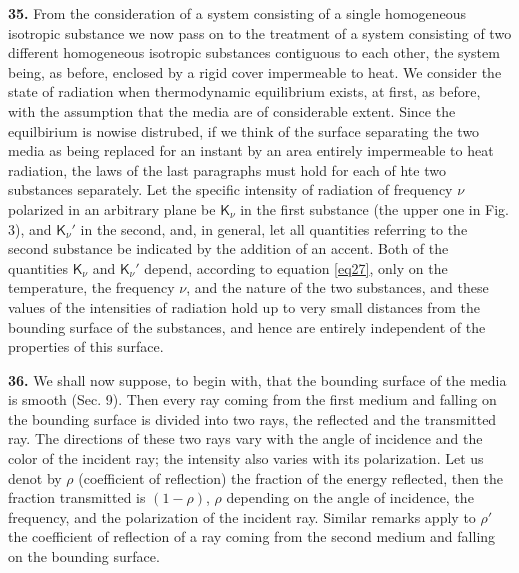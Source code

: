 \documentclass[12pt,oneside]{book}
\begin{document}
\textbf{35.} From the consideration of a system consisting of a single homogeneous isotropic substance we now pass on to the treatment of a system consisting of two different homogeneous isotropic substances contiguous to each other, the system being, as before, enclosed by a rigid cover impermeable to heat. We consider the state of radiation when thermodynamic equilibrium exists, at first, as before, with the assumption that the media are of considerable extent. Since the equilbirium is nowise distrubed, if we think of the surface separating the two media as being replaced for an instant by an area entirely impermeable to heat radiation, the laws of the last paragraphs must hold for each of hte two substances separately. Let the specific intensity of radiation of frequency $\nu$ polarized in an arbitrary plane be $\mathsf{K}_\nu$ in the first substance (the upper one in Fig. 3), and $\mathsf{K}_\nu'$ in the second, and, in general, let all quantities referring to the second substance be indicated by the addition of an accent. Both of the quantities $\mathsf{K}_\nu$ and $\mathsf{K}_\nu'$ depend, according to equation \eqref{eq27}, only on the temperature, the frequency $\nu$, and the nature of the two substances, and these values of the intensities of radiation hold up to very small distances from the bounding surface of the substances, and hence are entirely independent of the properties of this surface. \par 

\textbf{36.} We shall now suppose, to begin with, that the bounding surface of the media is smooth (Sec. 9). Then every ray coming from the first medium and falling on the bounding surface is divided into two rays, the reflected and the transmitted ray. The directions of these two rays vary with the angle of incidence and the color of the incident ray; the intensity also varies with its polarization. Let us denot by $\rho$ (coefficient of reflection) the fraction of the energy reflected, then the fraction transmitted is $(1-\rho)$, $\rho$ depending on the angle of incidence, the frequency, and the polarization of the incident ray. Similar remarks apply to $\rho'$ the coefficient of reflection of a ray coming from the second medium and falling on the bounding surface. \par 
\end{document}
